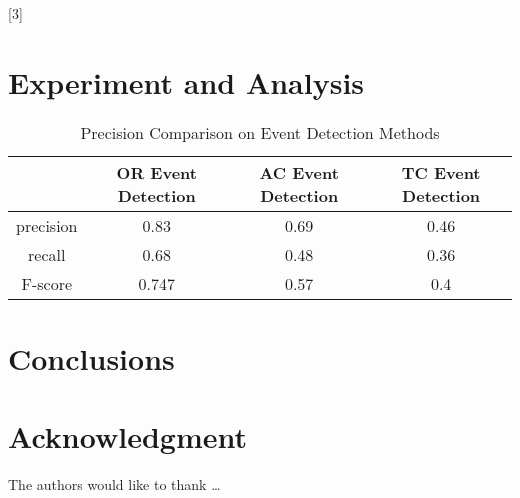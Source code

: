  
 
 
\blindtext

[3]
\blinditemize
\blindenumerate

\blindmathtrue
\blinddescription

\qwuMarker

\section{Experiment and Analysis} \label{sec-experiment}


\begin{table}  \centering
  \caption{Precision Comparison on Event Detection Methods}
  \label{tbl:overall-experiments}
  \begin{tabular}{cccc}
\toprule
    & OR Event Detection & AC Event Detection & TC Event Detection \\
\midrule
    precision & 0.83 & 0.69 & 0.46 \\
    recall & 0.68 & 0.48 & 0.36 \\
    F-score & 0.747 & 0.57 & 0.4 \\
\bottomrule
\end{tabular}
\end{table}


\section{Conclusions} \label{sec-conclusions}

\blindtext

\section*{Acknowledgment}

\lipsum[1]


The authors would like to thank \ldots

